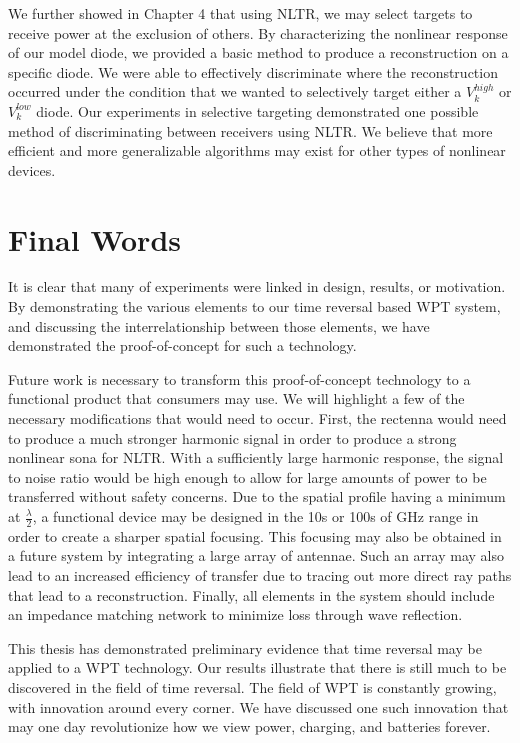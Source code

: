 We further showed in Chapter 4 that using NLTR, we may select targets to receive power at the exclusion of others. By characterizing the nonlinear response of our model diode, we provided a basic method to produce a reconstruction on a specific diode. We were able to effectively discriminate where the reconstruction occurred under the condition that we wanted to selectively target either a $V_{k}^{high}$ or $V_{k}^{low}$ diode. Our experiments in selective targeting demonstrated one possible method of discriminating between receivers using NLTR. We believe that more efficient and more generalizable algorithms may exist for other types of nonlinear devices.

\section{Final Words}

It is clear that many of experiments were linked in design, results, or motivation. By demonstrating the various elements to our time reversal based WPT system, and discussing the interrelationship between those elements, we have demonstrated the proof-of-concept for such a technology.

Future work is necessary to transform this proof-of-concept technology to a functional product that consumers may use. We will highlight a few of the necessary modifications that would need to occur. First, the rectenna would need to produce a much stronger harmonic signal in order to produce a strong nonlinear sona for NLTR. With a sufficiently large harmonic response, the signal to noise ratio would be high enough to allow for large amounts of power to be transferred without safety concerns. Due to the spatial profile having a minimum at $\frac{\lambda}{2}$, a functional device may be designed in the 10s or 100s of GHz range in order to create a sharper spatial focusing. This focusing may also be obtained in a future system by integrating a large array of antennae. Such an array may also lead to an increased efficiency of transfer due to tracing out more direct ray paths that lead to a reconstruction.  Finally, all elements in the system should include an impedance matching network to minimize loss through wave reflection.

This thesis has demonstrated preliminary evidence that time reversal may be applied to a WPT technology. Our results illustrate that there is still much to be discovered in the field of time reversal. The field of WPT is constantly growing, with innovation around every corner. We have discussed one such innovation that may one day revolutionize how we view power, charging, and batteries forever.
